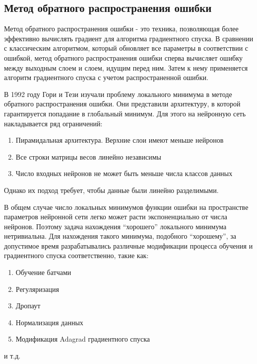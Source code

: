 \subsection{Метод обратного распространения ошибки}
Метод обратного распространения ошибки - это техника, позволяющая более
эффективно вычислять градиент для алгоритма градиентного спуска. В сравнении
с классическим алгоритмом, который обновляет все параметры в соответствии с
ошибкой, метод обратного распространения ошибки сперва вычисляет ошибку между
выходным слоем и слоем, идущим перед ним. Затем к нему применяется алгоритм градиентного спуска с учетом распространенной ошибки.
\par
В 1992 году Гори и Тези\cite{Gori1992} изучали проблему локального минимума в
методе обратного распространения ошибки. Они представили архитектуру, в которой гарантируется попадание в глобальный минимум. Для этого на нейронную сеть накладывается ряд ограничений:
\begin{enumerate}
	\item Пирамидальная архитектура. Верхние слои имеют меньше нейронов
	\item Все строки матрицы весов линейно независимы
	\item Число входных нейронов не может быть меньше числа классов данных
\end{enumerate}
Однако их подход требует, чтобы данные были линейно разделимыми.
\par
В общем случае число локальных минимумов функции ошибки на пространстве параметров
нейронной сети легко может расти экспоненциально от числа нейронов. Поэтому
задача нахождения “хорошего” локального минимума нетривиальна. Для нахождения
такого минимума, подобного “хорошему”, за допустимое время разрабатывались различные модификации процесса обучения и градиентного спуска соответственно, такие как:
\begin{enumerate}
	\item Обучение батчами
	\item Регуляризация
	\item Дропаут
	\item Нормализация данных
	\item Модификация Adagrad градиентного спуска
\end{enumerate}
и т.д.
